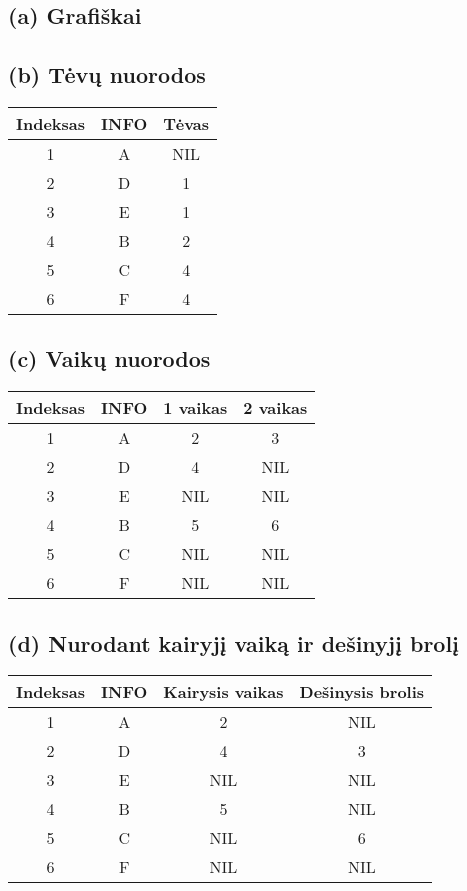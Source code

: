\documentclass[a4paper,lithuanian]{article}
\begin{document}
\subsection*{(a) Grafiškai}
\begin{center}
\end{center}
\subsection*{(b) Tėvų nuorodos}
\begin{center}
\begin{tabular}{c c c}
  \hline
  Indeksas & INFO & Tėvas\\
  \hline
  1 & A & NIL\\
  2 & D & 1\\
  3 & E & 1\\
  4 & B & 2\\
  5 & C & 4\\
  6 & F & 4\\
  \hline
\end{tabular}
\end{center}
\subsection*{(c) Vaikų nuorodos}

\begin{center}
\begin{tabular}{c c c c}
  \hline
  Indeksas & INFO & 1 vaikas & 2 vaikas\\
  \hline
  1 & A & 2 & 3\\
  2 & D & 4 & NIL\\
  3 & E & NIL & NIL\\
  4 & B & 5 & 6\\
  5 & C & NIL & NIL\\
  6 & F & NIL & NIL\\
  \hline
\end{tabular}
\end{center}

\subsection*{(d) Nurodant kairyjį vaiką ir dešinyjį brolį}
\begin{center}
\begin{tabular}{c c c c}
  \hline
  Indeksas & INFO & Kairysis vaikas & Dešinysis brolis\\
  \hline
  1 & A & 2 & NIL\\
  2 & D & 4 & 3\\
  3 & E & NIL & NIL\\
  4 & B & 5 & NIL\\
  5 & C & NIL & 6\\
  6 & F & NIL & NIL\\
  \hline
\end{tabular}
\end{center}
\pagebreak
\end{document}
